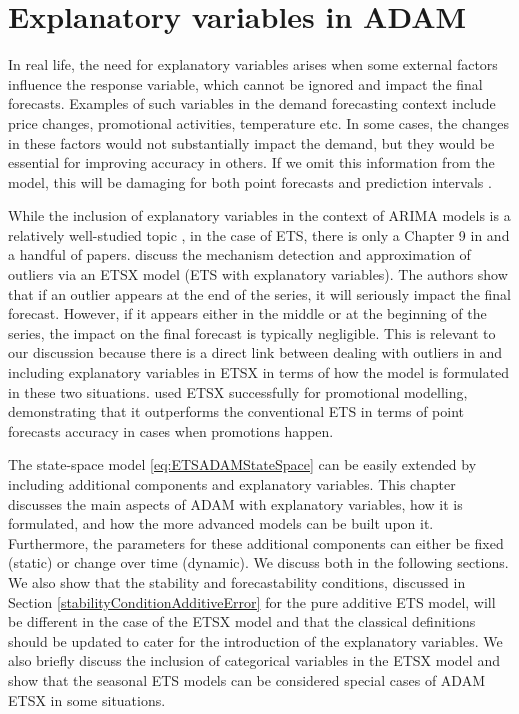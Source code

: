 \documentclass[
]{book}
\theoremstyle{definition}
\theoremstyle{definition}
\theoremstyle{definition}
\theoremstyle{definition}
\theoremstyle{remark}
\begin{document}
\hypertarget{ADAMX}{%
\chapter{Explanatory variables in ADAM}\label{ADAMX}}

In real life, the need for explanatory variables arises when some external factors influence the response variable, which cannot be ignored and impact the final forecasts. Examples of such variables in the demand forecasting context include price changes, promotional activities, temperature etc. In some cases, the changes in these factors would not substantially impact the demand, but they would be essential for improving accuracy in others. If we omit this information from the model, this will be damaging for both point forecasts and prediction intervals \citep[see discussion in Chapter 12 of][]{SvetunkovSBA}.

While the inclusion of explanatory variables in the context of ARIMA models is a relatively well-studied topic \citep[for example, this was discussed by][]{Box1976}, in the case of ETS, there is only a Chapter 9 in \citet{Hyndman2008b} and a handful of papers. \citet{Koehler2012} discuss the mechanism detection and approximation of outliers via an ETSX model (ETS with explanatory variables). The authors show that if an outlier appears at the end of the series, it will seriously impact the final forecast. However, if it appears either in the middle or at the beginning of the series, the impact on the final forecast is typically negligible. This is relevant to our discussion because there is a direct link between dealing with outliers in \citet{Koehler2012} and including explanatory variables in ETSX in terms of how the model is formulated in these two situations. \citet{Kourentzes2015} used ETSX successfully for promotional modelling, demonstrating that it outperforms the conventional ETS in terms of point forecasts accuracy in cases when promotions happen.

The state-space model \eqref{eq:ETSADAMStateSpace} can be easily extended by including additional components and explanatory variables. This chapter discusses the main aspects of ADAM with explanatory variables, how it is formulated, and how the more advanced models can be built upon it. Furthermore, the parameters for these additional components can either be fixed (static) or change over time (dynamic). We discuss both in the following sections. We also show that the stability and forecastability conditions, discussed in Section \ref{stabilityConditionAdditiveError} for the pure additive ETS model, will be different in the case of the ETSX model and that the classical definitions should be updated to cater for the introduction of the explanatory variables. We also briefly discuss the inclusion of categorical variables in the ETSX model and show that the seasonal ETS models can be considered special cases of ADAM ETSX in some situations.
\end{document}
